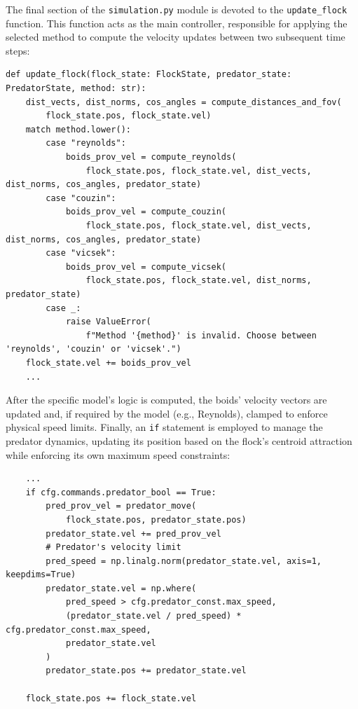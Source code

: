 The final section of the \texttt{simulation.py} module is devoted to the \texttt{update\_flock} function. This function acts as the main controller, responsible for applying the selected method to compute the velocity updates between two subsequent time steps:

\begin{verbatim}
def update_flock(flock_state: FlockState, predator_state: PredatorState, method: str):
    dist_vects, dist_norms, cos_angles = compute_distances_and_fov(
        flock_state.pos, flock_state.vel)
    match method.lower():
        case "reynolds":
            boids_prov_vel = compute_reynolds(
                flock_state.pos, flock_state.vel, dist_vects, dist_norms, cos_angles, predator_state)
        case "couzin":
            boids_prov_vel = compute_couzin(
                flock_state.pos, flock_state.vel, dist_vects, dist_norms, cos_angles, predator_state)
        case "vicsek":
            boids_prov_vel = compute_vicsek(
                flock_state.pos, flock_state.vel, dist_norms, predator_state)
        case _:
            raise ValueError(
                f"Method '{method}' is invalid. Choose between 'reynolds', 'couzin' or 'vicsek'.")
    flock_state.vel += boids_prov_vel
    ...
\end{verbatim}

After the specific model's logic is computed, the boids' velocity vectors are updated and, if required by the model (e.g., Reynolds), clamped to enforce physical speed limits. Finally, an \texttt{if} statement is employed to manage the predator dynamics, updating its position based on the flock's centroid attraction while enforcing its own maximum speed constraints:

\begin{verbatim}
    ...
    if cfg.commands.predator_bool == True:
        pred_prov_vel = predator_move(
            flock_state.pos, predator_state.pos)
        predator_state.vel += pred_prov_vel
        # Predator's velocity limit
        pred_speed = np.linalg.norm(predator_state.vel, axis=1, keepdims=True)
        predator_state.vel = np.where(
            pred_speed > cfg.predator_const.max_speed,
            (predator_state.vel / pred_speed) * cfg.predator_const.max_speed,
            predator_state.vel
        )
        predator_state.pos += predator_state.vel

    flock_state.pos += flock_state.vel
\end{verbatim}

